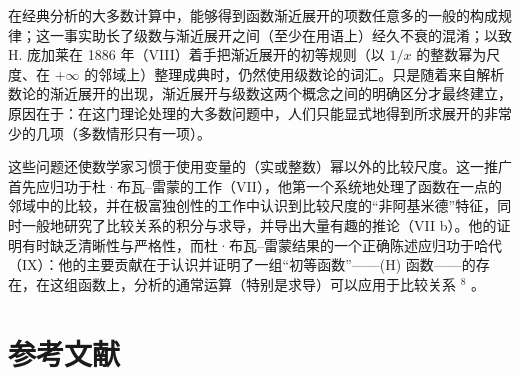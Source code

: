 在经典分析的大多数计算中，能够得到函数渐近展开的项数任意多的一般的构成规律；这一事实助长了级数与渐近展开之间（至少在用语上）经久不衰的混淆；以致 H. 庞加莱在 1886 年（VIII）着手把渐近展开的初等规则（以 \(1 / x\) 的整数幂为尺度、在 \(+\infty\) 的邻域上）整理成典时，仍然使用级数论的词汇。只是随着来自解析数论的渐近展开的出现，渐近展开与级数这两个概念之间的明确区分才最终建立，原因在于：在这门理论处理的大多数问题中，人们只能显式地得到所求展开的非常少的几项（多数情形只有一项）。

这些问题还使数学家习惯于使用变量的（实或整数）幂以外的比较尺度。这一推广首先应归功于杜·布瓦–雷蒙的工作（VII），他第一个系统地处理了函数在一点的邻域中的比较，并在极富独创性的工作中认识到比较尺度的“非阿基米德”特征，同时一般地研究了比较关系的积分与求导，并导出大量有趣的推论（VII b）。他的证明有时缺乏清晰性与严格性，而杜·布瓦–雷蒙结果的一个正确陈述应归功于哈代（IX）：他的主要贡献在于认识并证明了一组“初等函数”——(H) 函数——的存在，在这组函数上，分析的通常运算（特别是求导）可以应用于比较关系 \({}^{8}\) 。

\section*{参考文献}
{}

